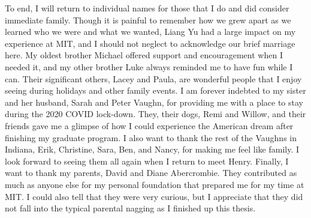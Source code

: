 To end, I will return to individual names for those that I do and did consider immediate family.
Though it is painful to remember how we grew apart as we learned who we were and what we wanted,
Liang Yu had a large impact on my experience at MIT,
and I should not neglect to acknowledge our brief marriage here.
My oldest brother Michael offered support and encouragement when I needed it, and
my other brother Luke always reminded me to have fun while I can.
Their significant others, Lacey and Paula, are wonderful people that I enjoy seeing during
holidays and other family events.
I am forever indebted to my sister and her husband, Sarah and Peter Vaughn,
for providing me with a place to stay during the 2020 COVID lock-down.
They, their dogs, Remi and Willow, and their friends gave me a glimpse of how I could experience
the American dream after finishing my graduate program.
I also want to thank the rest of the Vaughns in Indiana,
Erik, Christine, Sara, Ben, and Nancy, for making me feel like family.
I look forward to seeing them all again when I return to meet Henry.
Finally, I want to thank my parents, David and Diane Abercrombie.
They contributed as much as anyone else for my personal foundation that
prepared me for my time at MIT.
I could also tell that they were very curious, but I appreciate that
they did not fall into the typical parental nagging as I finished up this thesis.

